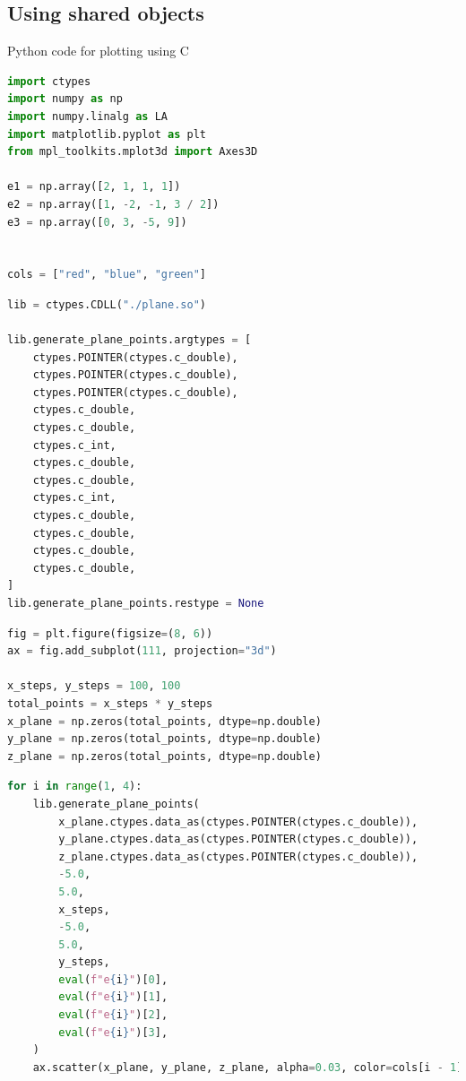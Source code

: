 \documentclass{beamer}
\theoremstyle{remark}
\numberwithin{equation}{section}
\begin{document}
\subsection{Using shared objects}
\begin{frame}[fragile]{Python code for plotting using C}
\begin{lstlisting}[language=Python]
import ctypes
import numpy as np
import numpy.linalg as LA
import matplotlib.pyplot as plt
from mpl_toolkits.mplot3d import Axes3D

e1 = np.array([2, 1, 1, 1])
e2 = np.array([1, -2, -1, 3 / 2])
e3 = np.array([0, 3, -5, 9])


cols = ["red", "blue", "green"]
\end{lstlisting}
\end{frame}
\begin{frame}[fragile]
 \begin{lstlisting}[language=Python]
lib = ctypes.CDLL("./plane.so")

lib.generate_plane_points.argtypes = [
    ctypes.POINTER(ctypes.c_double),
    ctypes.POINTER(ctypes.c_double),
    ctypes.POINTER(ctypes.c_double),
    ctypes.c_double,
    ctypes.c_double,
    ctypes.c_int,
    ctypes.c_double,
    ctypes.c_double,
    ctypes.c_int,
    ctypes.c_double,
    ctypes.c_double,
    ctypes.c_double,
    ctypes.c_double,
]
lib.generate_plane_points.restype = None
 \end{lstlisting}
\end{frame}
\begin{frame}[fragile]
 \begin{lstlisting}[language=Python]
fig = plt.figure(figsize=(8, 6))
ax = fig.add_subplot(111, projection="3d")

x_steps, y_steps = 100, 100
total_points = x_steps * y_steps
x_plane = np.zeros(total_points, dtype=np.double)
y_plane = np.zeros(total_points, dtype=np.double)
z_plane = np.zeros(total_points, dtype=np.double)
 \end{lstlisting}
\end{frame}
\begin{frame}[fragile]
 \begin{lstlisting}[language=Python]
for i in range(1, 4):
    lib.generate_plane_points(
        x_plane.ctypes.data_as(ctypes.POINTER(ctypes.c_double)),
        y_plane.ctypes.data_as(ctypes.POINTER(ctypes.c_double)),
        z_plane.ctypes.data_as(ctypes.POINTER(ctypes.c_double)),
        -5.0,
        5.0,
        x_steps,
        -5.0,
        5.0,
        y_steps,
        eval(f"e{i}")[0],
        eval(f"e{i}")[1],
        eval(f"e{i}")[2],
        eval(f"e{i}")[3],
    )
    ax.scatter(x_plane, y_plane, z_plane, alpha=0.03, color=cols[i - 1])
 \end{lstlisting}
\end{frame}
\end{document}
